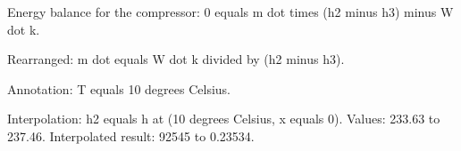 Energy balance for the compressor:  
0 equals m dot times (h2 minus h3) minus W dot k.  

Rearranged:  
m dot equals W dot k divided by (h2 minus h3).  

Annotation: T equals 10 degrees Celsius.  

Interpolation:  
h2 equals h at (10 degrees Celsius, x equals 0).  
Values: 233.63 to 237.46.  
Interpolated result: 92545 to 0.23534.